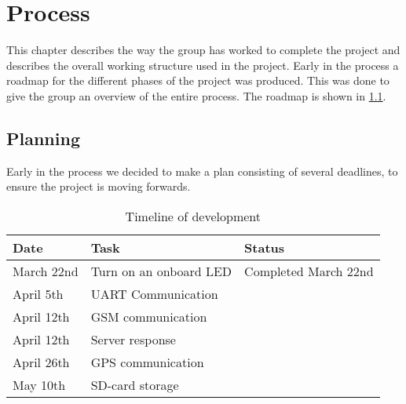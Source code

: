 
\chapter{Process}
This chapter describes the way the group has worked to complete the project and describes the overall working structure used in the project.
Early in the process a roadmap for the different phases of the project was produced. This was done to give the group an overview of the entire process. The roadmap is shown in \cref{tab:timeline}.

\section{Planning}
Early in the process we decided to make a plan consisting of several deadlines, to ensure the project is moving forwards.

\begin{table}[H]
	\begin{tabularx}{\textwidth}{l X X}
		\toprule
		Date & Task & Status \\
		\midrule
		March 22nd & Turn on an onboard LED & Completed March 22nd \\
		April 5th & UART Communication & \\
		April 12th & GSM communication & \\
		April 12th & Server response & \\
		April 26th & GPS communication & \\
		May 10th & SD-card storage & \\
		\bottomrule
	\end{tabularx}
	\caption{Timeline of development}
	\label{tab:timeline}
\end{table}